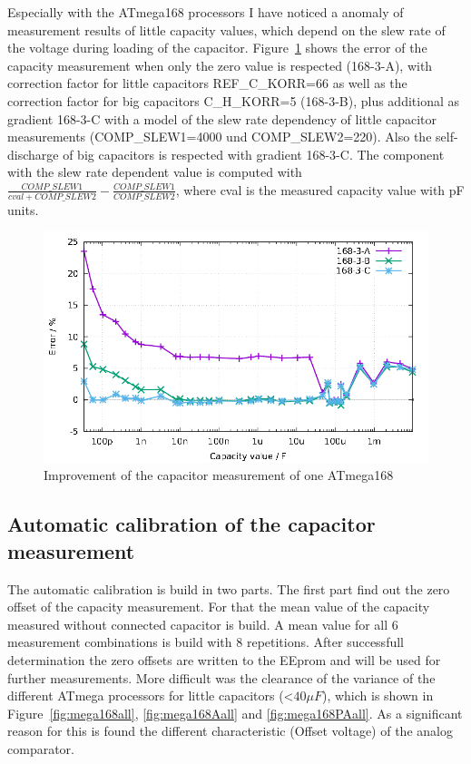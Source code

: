 Especially with the ATmega168 processors I have noticed a anomaly of measurement results of little capacity values,
which depend on the slew rate of the voltage during loading of the capacitor.
Figure~\ref{fig:mega168optcap} shows the error of the capacity measurement when only the zero value is respected
(168-3-A), with correction factor for little capacitors REF\_C\_KORR=66 as well as the correction factor for big
capacitors C\_H\_KORR=5 (168-3-B), plus additional as gradient 168-3-C  with a model of the slew rate dependency of little capacitor 
measurements (COMP\_SLEW1=4000 und COMP\_SLEW2=220). Also the self-discharge of big capacitors is respected with gradient 168-3-C.
The component with the slew rate dependent value is computed with \(\frac{COMP\_SLEW1}{cval+COMP\_SLEW2} - \frac{COMP\_SLEW1}{COMP\_SLEW2}\),
where cval is the measured capacity value with pF units.

\begin{figure}[H]
\centering
\includegraphics[width=16cm]{../GNU/Mega168cap_opt.pdf}
\caption{Improvement of the capacitor measurement of one ATmega168}
\label{fig:mega168optcap}
\end{figure}

\subsection{Automatic calibration of the capacitor measurement}

The automatic calibration is build in two parts. The first part find out the zero offset of the capacity measurement.
For that the mean value of the capacity measured without connected capacitor is build. 
A mean value for all 6 measurement combinations is build with 8 repetitions.
After successfull determination the zero offsets are written to the EEprom and will be used for further measurements.
More difficult was the clearance of the variance of the different ATmega processors for little capacitors (\textless \(40 \mu F\)),
which is shown in Figure~\ref{fig:mega168all}, \ref{fig:mega168Aall} and \ref{fig:mega168PAall}.
As a significant reason for this is found the different characteristic (Offset voltage) of the analog comparator.

